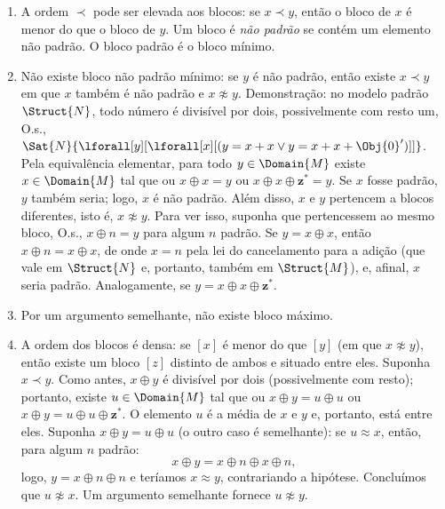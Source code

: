 \documentclass[../../../include/open-logic-section]{subfiles}
\begin{document}
\begin{enumerate}
  impossível porque implica $x \approx y$; logo, $x \prec
  y$. Analogamente, se $x \prec y$ e $x \not\approx y$, então $x \prec
  {^*y}$. Portanto, se $x \prec y$ e $x \not\approx y$, todo
  $w \approx x$ é $\prec$-menor do que todo $v \approx y$. Assim,
  cada bloco $[x]$ forma uma cadeia duplamente infinita
  \[
  \cdots \prec  {^{**}x} \prec {^*}x \prec x \prec x^* \prec x^{**}
  \prec \cdots
  \]
  chamada de cadeia $Z$ porque tem o tipo de ordem dos
  inteiros.
\item A ordem $\prec$ pode ser elevada aos blocos: se $x \prec y$,
  então o bloco de $x$ é menor do que o bloco de $y$. Um bloco é
  \emph{não padrão} se contém um elemento não padrão. O
  bloco padrão é o bloco mínimo. 
\item Não existe bloco não padrão mínimo: se $y$ é não padrão,
  então existe $x \prec y$ em que $x$ também é não padrão e $x
  \not\approx y$. Demonstração: no modelo padrão $\Struct{N}$, todo
  número é divisível por dois, possivelmente com resto um, O.s.\@,
  $\Sat{N}{\lforall[y][\lforall[x][(y = x + x \lor y = x + x +
        \Obj{0}')]]}$. Pela equivalência elementar, para todo $y \in
  \Domain{M}$ existe $x \in \Domain{M}$ tal que ou $x \oplus x
  = y$ ou $x \oplus x \oplus \mathbf{z}^*= y$. Se $x$ fosse padrão,
  $y$ também seria; logo, $x$ é não padrão. Além disso, $x$ e
  $y$ pertencem a blocos diferentes, isto é, $x \not\approx y$. Para ver
  isso, suponha que pertencessem ao mesmo bloco, O.s.\@, $x \oplus n =
  y$ para algum $n$ padrão. Se $y = x \oplus x$, então $x \oplus n = x
  \oplus x$, de onde $x = n$ pela lei do cancelamento para a adição
  (que vale em $\Struct{N}$ e, portanto, também em $\Struct{M}$),
  e, afinal, $x$ seria padrão. Analogamente, se $y = x \oplus x
  \oplus \mathbf{z}^*$.
\item Por um argumento semelhante, não existe bloco máximo. 
\item A ordem dos blocos é densa: se $[x]$ é menor do que $[y]$
  (em que $x \not\approx y$), então existe um bloco $[z]$ distinto de
  ambos e situado entre eles. Suponha $x \prec y$. Como antes, $x \oplus
  y$ é divisível por dois (possivelmente com resto); portanto, existe $u
  \in \Domain{M}$ tal que ou $x \oplus y = u \oplus u$ ou $x
  \oplus y = u \oplus u \oplus \mathbf{z}^*$. O elemento $u$ é a
  média de $x$ e $y$ e, portanto, está entre eles. Suponha $x \oplus y =
  u \oplus u$ (o outro caso é semelhante): se $u \approx x$, então,
  para algum $n$ padrão:
  \[
  x \oplus y = x \oplus n \oplus x \oplus n,
  \]
  logo, $y = x \oplus n \oplus n$ e teríamos $x \approx y$,
  contrariando a hipótese. Concluímos que $u \not\approx x$. Um argumento
  semelhante fornece $u \not\approx y$.
\end{enumerate}
\end{document}
